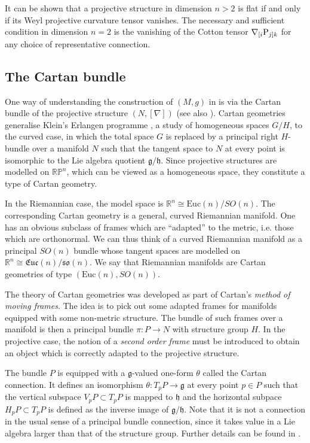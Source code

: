 It can be shown that a projective structure in dimension $n>2$ is flat if and only if its Weyl projective curvature tensor vanishes. The necessary and sufficient condition in dimension $n=2$ is the vanishing of the Cotton tensor $\nabla_{[i}\mathrm{P}_{j]k}$ for any choice of representative connection.

\subsection{The Cartan bundle}

One way of understanding the construction of $(M,g)$ in \cite{DM}
is via the Cartan bundle \cite{Cartan} of the projective structure $(N,[\nabla])$ (see also \cite{KobNag}). Cartan geometries generalise Klein's Erlangen programme \cite{Klein}, a study of homogeneous spaces $G/H$, to the curved case, in which the total space $G$ is replaced by a principal right $H$-bundle over a manifold $N$ such that the tangent space to $N$ at every point is isomorphic to the Lie algebra quotient $\mathfrak{g}/\mathfrak{h}$. Since projective structures are modelled on $\mathbb{RP}^{n}$, which can be viewed as a homogeneous space, they constitute a type of Cartan geometry.

In the Riemannian case, the model space is $\mathbb{R}^{n}\cong\mathrm{Euc}(n)/SO(n)$. The corresponding Cartan geometry is a general, curved Riemannian manifold. One has an obvious subclass of frames which are ``adapted'' to the metric, i.e. those which are orthonormal. We can thus think of a curved Riemannian manifold as a principal $SO(n)$ bundle whose tangent spaces are modelled on $\mathbb{R}^{n}\cong\mathfrak{Euc}(n)/\mathfrak{so}(n)$. We say that Riemannian manifolds are Cartan geometries of type $(\mathrm{Euc}(n),SO(n))$.

The theory of Cartan geometries was developed as part of Cartan's
\textit{method of moving frames}. The idea is to pick out some adapted frames for manifolds equipped with some non-metric structure. The bundle of such frames over a manifold is then a principal bundle $\pi:P\rightarrow N$ with structure group $H$. In the projective case, the notion of a \textit{second order frame} must be introduced to obtain an object which is correctly adapted to the projective structure.

The bundle $P$ is equipped with a $\mathfrak{g}$-valued one-form
$\theta$ called the Cartan connection. It defines an isomorphism $\theta:T_{p}P\rightarrow\mathfrak{g}$ at every point $p\in P$ such that the vertical subspace $V_{p}P\subset T_{p}P$ is mapped to $\mathfrak{h}$ and the horizontal subpace $H_{p}P\subset T_{p}P$ is defined as the inverse image of $\mathfrak{g}/\mathfrak{h}$. Note that it is not a connection in the usual sense of a principal bundle connection, since it takes value in a Lie algebra larger than that of the structure group. Further details can be found in \cite{Sharpe}.

